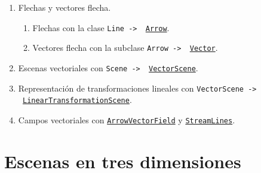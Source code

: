 \documentclass[a4paper]{article}
\begin{document}
\begin{enumerate}

    \item Flechas y vectores flecha.
    \begin{enumerate}[label=1.\arabic*]

        \item Flechas con la clase \texttt{Line -> \ \href{https://docs.manim.community/en/v0.16.0.post0/reference/manim.mobject.geometry.line.Arrow.html?highlight=Arrow}{Arrow}}.

        \item Vectores flecha con la subclase \texttt{Arrow -> \ \href{https://docs.manim.community/en/v0.16.0.post0/reference/manim.mobject.geometry.line.Vector.html?highlight=Vector}{Vector}}.
    \end{enumerate}

    \item Escenas vectoriales con \texttt{Scene -> \ \href{https://docs.manim.community/en/v0.16.0.post0/reference/manim.scene.vector_space_scene.VectorScene.html?highlight=VectorScene}{VectorScene}}.

    \item Representación de transformaciones lineales con \texttt{VectorScene -> \ \href{https://docs.manim.community/en/v0.16.0.post0/reference/manim.scene.vector_space_scene.LinearTransformationScene.html?highlight=LinearTransformationScene}{LinearTransformationScene}}.

    \item Campos vectoriales con \href{https://docs.manim.community/en/v0.16.0.post0/reference/manim.mobject.vector_field.ArrowVectorField.html?highlight=ArrowVectorField}{\texttt{ArrowVectorField}} y \href{https://docs.manim.community/en/v0.16.0.post0/reference/manim.mobject.vector_field.StreamLines.html?highlight=StreamLines}{\texttt{StreamLines}}.
\end{enumerate}

\section{Escenas en tres dimensiones} \label{Sec: Escenas en tres dimensiones}
\end{document}
